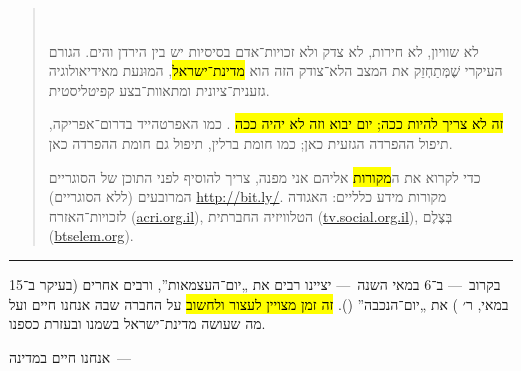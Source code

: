 \begin{quote}
\begin{center}
	\\
\end{center}

לא שוויון, לא חירות, לא צדק ולא זכויות־אדם בסיסיות יש בין הירדן והים. הגורם העיקרי שֶׁמְּתַחְזֵק את המצב הלא־צודק הזה הוא \hl{מדינת־ישראל}, המוּנעת מאידיאולוגיה גזענית־ציונית ומתאוות־בצע קפיטליסטית.

\hl{זה לא צריך להיות ככה; יום יבוא וזה לא יהיה ככה }. כמו האפרטהייד בדרום־אפריקה, תיפול ההפרדה הגזעית כאן; כמו חומת ברלין, תיפול גם חומת ההפרדה כאן.


{\small כדי לקרוא את ה\hl{מקורות} אליהם אני מפנה, צריך להוסיף לפני התוכן של הסוגריים המרובעים (ללא הסוגריים) {\url{http://bit.ly/}}. מקורות מידע כלליים:
האגודה לזכויות־האזרח (\url{acri.org.il}), הטלוויזיה החברתית (\url{tv.social.org.il}), בְּצֶלֶם (\url{btselem.org}).}
\end{quote}

\hrule

בקרוב~— ב־6 במאי השנה~— יציינו רבים את „יום־העצמ{\small א}ות”, ורבים אחרים (בעיקר ב־15 במאי, ר׳ ) את „יום־הנכבה” (). \hl{זה זמן מצויין לעצור ולחשוב} על החברה שבה אנחנו חיים ועל מה שעושה מדינת־ישראל בשמנו ובעזרת כספנו.

{\setlength\parindent{-0.5em}\Large אנחנו חיים במדינה~—}

